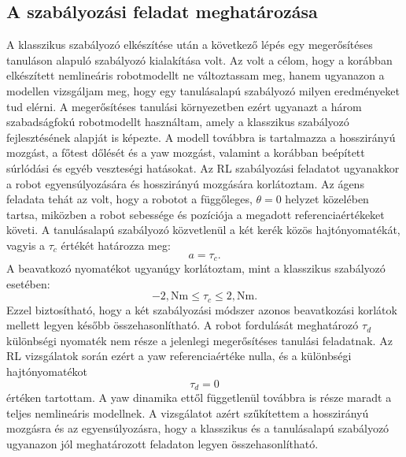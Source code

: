 \documentclass[12pt,a4paper]{report}
\begin{document}
	\subsection{A szabályozási feladat meghatározása}
	A klasszikus szabályozó elkészítése után a következő lépés egy megerősítéses tanuláson alapuló szabályozó kialakítása volt. Az volt a célom, hogy a korábban elkészített nemlineáris robotmodellt ne változtassam meg, hanem ugyanazon a modellen vizsgáljam meg, hogy egy tanulásalapú szabályozó milyen eredményeket tud elérni.
	\newline
	\newline
	A megerősítéses tanulási környezetben ezért ugyanazt a három szabadságfokú robotmodellt használtam, amely a klasszikus szabályozó fejlesztésének alapját is képezte. A modell továbbra is tartalmazza a hosszirányú mozgást, a főtest dőlését és a yaw mozgást, valamint a korábban beépített súrlódási és egyéb veszteségi hatásokat.
	\newline
	\newline
	Az RL szabályozási feladatot ugyanakkor a robot egyensúlyozására és hosszirányú mozgására korlátoztam. Az ágens feladata tehát az volt, hogy a robotot a függőleges, $\theta=0$ helyzet közelében tartsa, miközben a robot sebessége és pozíciója a megadott referenciaértékeket követi.
	\newline
	\newline
	A tanulásalapú szabályozó közvetlenül a két kerék közös hajtónyomatékát, vagyis a $\tau_c$ értékét határozza meg:
	\begin{equation}
		a = \tau_c.
	\end{equation}
	A beavatkozó nyomatékot ugyanúgy korlátoztam, mint a klasszikus szabályozó esetében:
	\begin{equation}
		-2,\mathrm{Nm}
		\leq
		\tau_c
		\leq
		2,\mathrm{Nm}.
	\end{equation}
	Ezzel biztosítható, hogy a két szabályozási módszer azonos beavatkozási korlátok mellett legyen később összehasonlítható.
	\newline
	\newline
	A robot fordulását meghatározó $\tau_d$ különbségi nyomaték nem része a jelenlegi megerősítéses tanulási feladatnak. Az RL vizsgálatok során ezért a yaw referenciaértéke nulla, és a különbségi hajtónyomatékot
	\begin{equation}
		\tau_d = 0
	\end{equation}
	értéken tartottam. A yaw dinamika ettől függetlenül továbbra is része maradt a teljes nemlineáris modellnek. A vizsgálatot azért szűkítettem a hosszirányú mozgásra és az egyensúlyozásra, hogy a klasszikus és a tanulásalapú szabályozó ugyanazon jól meghatározott feladaton legyen összehasonlítható.
\end{document}
